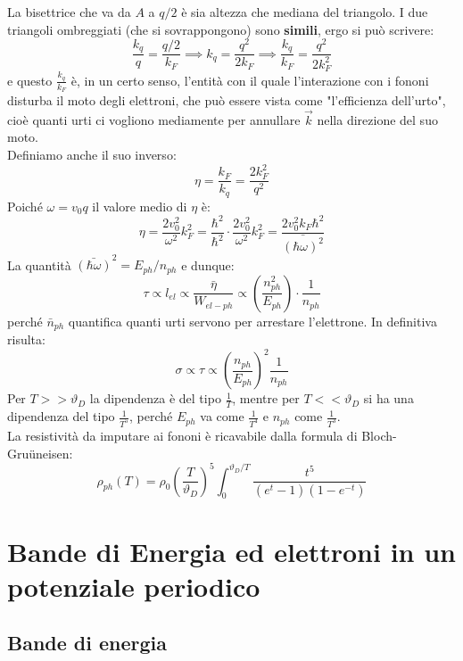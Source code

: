 \documentclass{book}
\begin{document}
        La bisettrice che va da $A$ a $q/2$ è sia altezza che mediana del triangolo. I due triangoli ombreggiati (che si sovrappongono) sono \textbf\textbf{simili}, ergo si può scrivere:
        $$\frac{k_{q}}{q} = \frac{q/2}{k_{F}} \implies k_{q} = \frac{q^{2}}{2k_{F}} \implies \frac{k_{q}}{k_{F}} = \frac{q^{2}}{2k_{F} ^{2}}$$
        e questo $\displaystyle \frac{k_{q}}{k_{F}}$ è, in un certo senso, l'entità con il quale l'interazione con i fononi disturba il moto degli elettroni, che può essere vista come "l'efficienza dell'urto", cioè quanti urti ci vogliono mediamente per annullare $\vec{k}$ nella direzione del suo moto.\\
        Definiamo anche il suo inverso:
        $$\eta = \frac{k_{F}}{k_{q}} = \frac{2k_{F} ^{2}}{q^{2}}$$
        Poiché $\omega = v_{0}q$ il valore medio di $\eta$ è:
        $$\eta = \frac{2v_{0} ^{2}}{\omega ^{2}}k_{F} ^{2} = \frac{\hbar ^{2}}{\hbar ^{2}} \cdot \frac{2v_{0} ^{2}}{\omega ^{2}}k_{F} ^{2} =  \frac{2v_{0} ^{2}k_{F} \hbar ^{2}}{\bar{(\hbar \omega)^{2}}}$$
        La quantità $\bar{(\hbar \omega)}^{2} = E_{ph}/n_{ph}$ e dunque:
        $$\tau \propto l_{el} \propto \frac{\bar{\eta}}{W_{el-ph}} \propto (\frac{n_{ph} ^{2}}{E_{ph}}) \cdot \frac{1}{n_{ph}}$$
        perché $\bar{n}_{ph}$ quantifica quanti urti servono per arrestare l'elettrone. In definitiva risulta:
        $$\sigma \propto \tau \propto (\frac{n_{ph}}{E_{ph}})^{2} \frac{1}{n_{ph}}$$
        Per $T>> \vartheta_{D}$ la dipendenza è del tipo $\displaystyle \frac{1}{T}$, mentre per $T<< \vartheta_{D}$ si ha una dipendenza del tipo $\displaystyle \frac{1}{T^{5}}$, perché $E_{ph}$ va come $\displaystyle \frac{1}{T^{4}}$ e $n_{ph}$ come $\displaystyle \frac{1}{T^{3}}$.\\
        La resistività da imputare ai fononi è ricavabile dalla formula di Bloch-Gru{\"u}neisen:
        $$\rho_{ph} (T) = \rho_{0} (\frac{T}{\vartheta_{D}}) ^{5} \int_{0} ^{\vartheta_{D}/T} \frac{t^{5}}{(e^{t}-1)(1-e^{-t})}$$
\chapter{Bande di Energia ed elettroni in un potenziale periodico}
    \section{Bande di energia}
\end{document}
